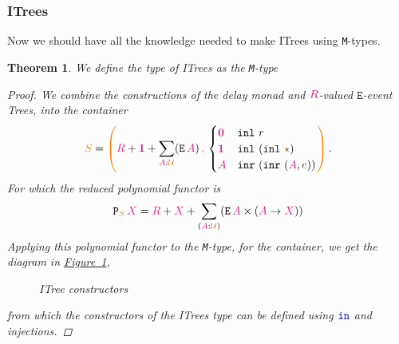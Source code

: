 \documentclass[twoside,11pt,openright]{report}
\theoremstyle{plain} %
\newtheorem{thm}{Theorem}[section]
\theoremstyle{definition}
\theoremstyle{remark}
\newcommand*{\figref}[1]{\hyperref[fig:#1]{Figure~\ref*{fig:#1}}}
\newcommand*{\term}[1]{\textcolor{green!30!black}{#1}} %
\newcommand*{\type}[1]{\textcolor{magenta!90!black}{#1}}
\newcommand*{\container}[1]{\textcolor{orange}{#1}}
\newcommand*{\containerpair}[2]{\ensuremath{\colorlet{savedleftcolor}{.}\color{orange}\left(\color{savedleftcolor}#1\,\textcolor{orange}{\mathbf{,}}\,#2\color{orange}\right)\color{savedleftcolor}}}
\newcommand*{\universe}[1]{\textcolor{orange!80!black}{#1}}
\newcommand*{\unit}{\type{\textbf{1}}}
\newcommand*{\empt}{\type{\textbf{0}}}
\newcommand*{\constant}[1]{\textcolor{orange!60!black}{\ensuremath{\mathtt{#1}}}}
\newcommand*{\function}[1]{\textcolor{blue!60!black}{\ensuremath{\mathtt{#1}}}}
\newcommand*{\constructor}[1]{\textcolor{purple!60!black}{\ensuremath{\mathtt{#1}}}}
\newcommand*{\typeformer}[1]{\ensuremath{\mathtt{#1}}}
\newcommand*{\functor}[1]{\ensuremath{\mathbf{\mathtt{#1}}}}
\newcommand*{\unitelem}{\constant{\star}} %
\begin{document}
\subsubsection{ITrees}
Now we should have all the knowledge needed to make ITrees using \texttt{M}-types.
\begin{thm}
  We define the type of ITrees as the \texttt{M}-type
  \begin{proof}
    We combine the constructions of the delay monad and \(\type{R}\)-valued \(\typeformer{E}\)-event Trees, into the container
    \begin{equation}
      \container{S} = \containerpair{\type{R}+\unit+\sum_{\type{A}:\universe{\mathcal{U}}} (\typeformer{E}\,\type{A})}{\begin{cases} \empt & \texttt{inl}~r \\ \unit & \texttt{inl}~(\texttt{inl}~\unitelem) \\ \type{A} & \texttt{inr}~(\texttt{inr}~(\type{A},\term{e})) \end{cases}}.
    \end{equation}
    \noindent For which the reduced polynomial functor is
    \begin{equation}
      \functor{P}_{\container{S}}\,\type{X} = \type{R} + \type{X} + \sum_{(\type{A} : \universe{\mathcal{U}})} (\typeformer{E}\,\type{A} \times (\type{A} \rightarrow \type{X}))
    \end{equation}
    Applying this polynomial functor to the \texttt{M}-type, for the container, we get the diagram in \figref{ITree-constructors},
    \begin{figure}[h]
      \centering
      \caption{ITree constructors}
      \label{fig:ITree-constructors}
    \end{figure}
    from which the constructors of the ITrees type can be defined using \(\function{in}\) and injections.
  \end{proof}
\end{thm}
\end{document}
